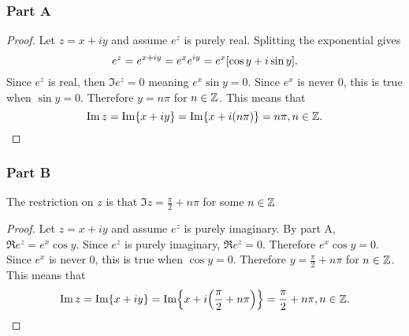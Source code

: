 \documentclass[12pt,titlepage]{extarticle}
\begin{document}
\subsubsection*{Part A}
\begin{proof}
    Let $z = x + iy$ and assume $e^z$ is purely real. Splitting the exponential gives
    \[
        e^z = e^{x + iy} = e^{x} e^{iy} = e^x \qty[\cos y + i \sin y]
    .\]
    Since $e^z$ is real, then $\Im e^z = 0$ meaning $e^x \sin y = 0$. Since $e^x$ is never $0$, this is true when $\sin y = 0$. Therefore $y = n \pi$ for $n \in \mathbb{Z}$. This means that
    \[
        \Im z = \Im{x + iy} = \Im{x + i(n \pi)} = n \pi, n \in \mathbb{Z}
    .\]
\end{proof}

\subsubsection*{Part B}
The restriction on $z$ is that $\Im z = \frac{\pi}{2} + n \pi$ for some $n \in \mathbb{Z}$
\begin{proof}
    Let $z = x + iy$ and assume $e^z$ is purely imaginary. By part A, $\Re{e^z} = e^x \cos y$. Since $e^z$ is purely imaginary, $\Re{e^z} = 0$. Therefore $e^x \cos y = 0$. Since $e^x$ is never $0$, this is true when $\cos y = 0$. Therefore $y = \frac{\pi}{2} + n \pi$ for $n \in \mathbb{Z}$. This means that
    \[
        \Im z = \Im{x + iy} = \Im{x + i\qty( \frac{\pi}{2} + n \pi)} = \frac{\pi}{2} + n \pi, n \in \mathbb{Z}
    .\]
\end{proof}
\end{document}
